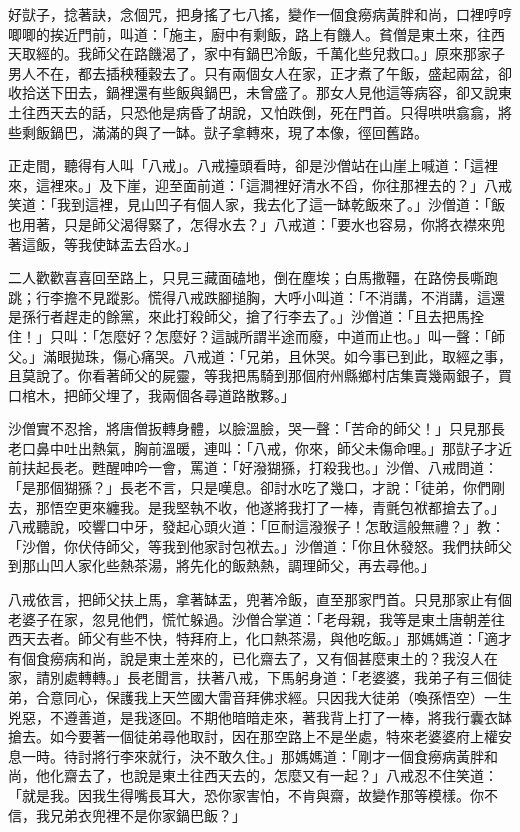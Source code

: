 好獃子，捻著訣，念個咒，把身搖了七八搖，變作一個食癆病黃胖和尚，口裡哼哼唧唧的挨近門前，叫道：「施主，廚中有剩飯，路上有饑人。貧僧是東土來，往西天取經的。我師父在路饑渴了，家中有鍋巴冷飯，千萬化些兒救口。」原來那家子男人不在，都去插秧種穀去了。只有兩個女人在家，正才煮了午飯，盛起兩盆，卻收拾送下田去，鍋裡還有些飯與鍋巴，未曾盛了。那女人見他這等病容，卻又說東土往西天去的話，只恐他是病昏了胡說，又怕跌倒，死在門首。只得哄哄翕翕，將些剩飯鍋巴，滿滿的與了一缽。獃子拿轉來，現了本像，徑回舊路。

正走間，聽得有人叫「八戒」。八戒擡頭看時，卻是沙僧站在山崖上喊道：「這裡來，這裡來。」及下崖，迎至面前道：「這澗裡好清水不舀，你往那裡去的？」八戒笑道：「我到這裡，見山凹子有個人家，我去化了這一缽乾飯來了。」沙僧道：「飯也用著，只是師父渴得緊了，怎得水去？」八戒道：「要水也容易，你將衣襟來兜著這飯，等我使缽盂去舀水。」

二人歡歡喜喜回至路上，只見三藏面磕地，倒在塵埃；白馬撒韁，在路傍長嘶跑跳；行李擔不見蹤影。慌得八戒跌腳搥胸，大呼小叫道：「不消講，不消講，這還是孫行者趕走的餘黨，來此打殺師父，搶了行李去了。」沙僧道：「且去把馬拴住！」只叫：「怎麼好？怎麼好？這誠所謂半途而廢，中道而止也。」叫一聲：「師父。」滿眼拋珠，傷心痛哭。八戒道：「兄弟，且休哭。如今事已到此，取經之事，且莫說了。你看著師父的屍靈，等我把馬騎到那個府州縣鄉村店集賣幾兩銀子，買口棺木，把師父埋了，我兩個各尋道路散夥。」

沙僧實不忍捨，將唐僧扳轉身體，以臉溫臉，哭一聲：「苦命的師父！」只見那長老口鼻中吐出熱氣，胸前溫暖，連叫：「八戒，你來，師父未傷命哩。」那獃子才近前扶起長老。甦醒呻吟一會，罵道：「好潑猢猻，打殺我也。」沙僧、八戒問道：「是那個猢猻？」長老不言，只是嘆息。卻討水吃了幾口，才說：「徒弟，你們剛去，那悟空更來纏我。是我堅執不收，他遂將我打了一棒，青氈包袱都搶去了。」八戒聽說，咬響口中牙，發起心頭火道：「叵耐這潑猴子！怎敢這般無禮？」教：「沙僧，你伏侍師父，等我到他家討包袱去。」沙僧道：「你且休發怒。我們扶師父到那山凹人家化些熱茶湯，將先化的飯熱熱，調理師父，再去尋他。」

八戒依言，把師父扶上馬，拿著缽盂，兜著冷飯，直至那家門首。只見那家止有個老婆子在家，忽見他們，慌忙躲過。沙僧合掌道：「老母親，我等是東土唐朝差往西天去者。師父有些不快，特拜府上，化口熱茶湯，與他吃飯。」那媽媽道：「適才有個食癆病和尚，說是東土差來的，已化齋去了，又有個甚麼東土的？我沒人在家，請別處轉轉。」長老聞言，扶著八戒，下馬躬身道：「老婆婆，我弟子有三個徒弟，合意同心，保護我上天竺國大雷音拜佛求經。只因我大徒弟（喚孫悟空）一生兇惡，不遵善道，是我逐回。不期他暗暗走來，著我背上打了一棒，將我行囊衣缽搶去。如今要著一個徒弟尋他取討，因在那空路上不是坐處，特來老婆婆府上權安息一時。待討將行李來就行，決不敢久住。」那媽媽道：「剛才一個食癆病黃胖和尚，他化齋去了，也說是東土往西天去的，怎麼又有一起？」八戒忍不住笑道：「就是我。因我生得嘴長耳大，恐你家害怕，不肯與齋，故變作那等模樣。你不信，我兄弟衣兜裡不是你家鍋巴飯？」

